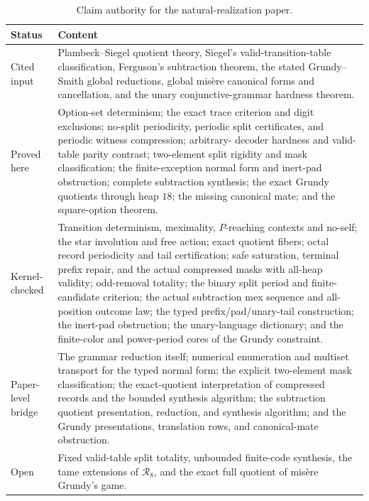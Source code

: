 \documentclass[11pt]{article}
\theoremstyle{definition}
\theoremstyle{remark}
\begin{document}
\begin{table}[ht]
\centering
\small
\begin{tabular}{p{}p{}}
\toprule
Status & Content \\
\midrule
Cited input & Plambeck--Siegel quotient theory, Siegel's valid-transition-table
classification, Ferguson's subtraction theorem, the stated Grundy--Smith
global reductions, global mis\`ere canonical forms and cancellation, and the unary conjunctive-grammar hardness theorem. \\
Proved here & Option-set determinism; the exact trace criterion and digit
exclusions; no-split periodicity, periodic split certificates, and periodic
witness compression; arbitrary-
decoder hardness and valid-table parity contrast; two-element split rigidity
and mask classification; the finite-exception normal form and inert-pad
obstruction; complete subtraction synthesis; the exact Grundy quotients
through heap $18$; the missing canonical mate; and the square-option theorem. \\
Kernel-checked & Transition determinism, meximality, $P$-reaching contexts and
no-self; the star involution and free action; exact quotient fibers; octal
record periodicity and tail certification; safe saturation, terminal
prefix repair, and the actual compressed masks with all-heap validity; odd-removal totality; the
binary split period and finite-candidate criterion; the actual subtraction
mex sequence and all-position outcome law; the typed prefix/pad/unary-tail
construction; the inert-pad obstruction; the unary-language dictionary; and
the finite-color and power-period cores of the Grundy constraint. \\
Paper-level bridge & The grammar reduction itself; numerical enumeration and
multiset transport for the typed normal form; the explicit two-element mask
classification; the exact-quotient interpretation of compressed records
and the bounded synthesis algorithm; the subtraction
quotient presentation, reduction, and synthesis algorithm; and the Grundy
presentations, translation rows, and canonical-mate obstruction. \\
Open & Fixed valid-table split totality, unbounded finite-code synthesis, the
tame extensions of $\mathcal R_8$, and the exact full quotient of mis\`ere
Grundy's game. \\
\bottomrule
\end{tabular}
\caption{Claim authority for the natural-realization paper.}
\label{tab:misere-status}
\end{table}
\end{document}
